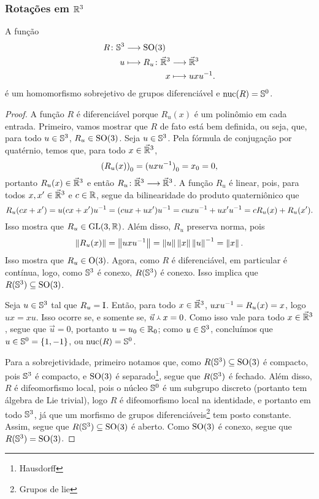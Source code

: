 \subsubsection{Rotações em \ensuremath{\R^3}}

\begin{proposition}
A função
	\begin{align*}
	\func{R}{\S^3}{\SO(3)}{u}{
		\begin{aligned}[t]
		\func{R_u}{\vec{\R}^3}{\vec{\R}^3}{x}{uxu\inv}.
		\end{aligned}
	}
	\end{align*}
é um homomorfismo sobrejetivo de grupos diferenciável e $\nuc(R)=\S^0$.
\end{proposition}
\begin{proof}
A função $R$ é diferenciável porque $R_u(x)$ é um polinômio em cada entrada. Primeiro, vamos mostrar que $R$ de fato está bem definida, ou seja, que, para todo $u \in \S^3$, $R_u \in \SO(3)$. Seja $u \in \S^3$. Pela fórmula de conjugação por quatérnio, temos que, para todo $x \in \vec{\R}^3$,
	\begin{equation*}
	\esc{(R_u(x))} = \esc{(uxu\inv)} = \esc{x} = 0,
	\end{equation*}
portanto $R_u(x) \in \vec{\R}^3$ e então $\fun{R_u}{\vec{\R}^3}{\vec{\R}^3}$. A função $R_u$ é linear, pois, para todos $x,x' \in \vec{\R}^3$ e $c \in \R$, segue da bilinearidade do produto quaterniônico que
	\begin{equation*}
	R_u(cx+x') = u(cx+x')u\inv = (cux+ux')u\inv = cuxu\inv + ux'u\inv = cR_u(x) + R_u(x').
	\end{equation*}
Isso mostra que $R_u \in \GL(3,\R)$. Além disso, $R_u$ preserva norma, pois
	\begin{equation*}
	\nor{R_u(x)} = \nor{uxu\inv} = \nor{u}\nor{x}\nor{u}\inv = \nor{x}.
	\end{equation*}
Isso mostra que $R_u \in \GO(3)$. Agora, como $R$ é diferenciável, em particular é contínua, logo, como $\S^3$ é conexo, $R(\S^3)$ é conexo. Isso implica que $R(\S^3) \subseteq \SO(3)$.

Seja $u \in \S^3$ tal que $R_u=\Id$. Então, para todo $x \in \vec{\R}^3$, $uxu\inv = R_u(x) = x$, logo $ux=xu$. Isso ocorre se, e somente se, $\pvec{\vec{u}}{x} = 0$. Como isso vale para todo $x \in \vec{\R}^3$, segue que $\vec{u}=0$, portanto $u=\esc{u} \in \esc{\R}$; como $u \in \S^3$, concluímos que $u \in \S^0 = \{1,-1\}$, ou $\nuc(R) = \S^0$.

Para a sobrejetividade, primeiro notamos que, como $R(\S^3) \subseteq \SO(3)$ é compacto, pois $\S^3$ é compacto, e $\SO(3)$ é separado\footnote{Hausdorff}, segue que $R(\S^3)$ é fechado. Além disso, $R$ é difeomorfismo local, pois o núcleo $\S^0$ é um subgrupo discreto (portanto tem álgebra de Lie trivial), logo $R$ é difeomorfismo local na identidade, e portanto em todo $\S^3$, já que um morfismo de grupos diferenciáveis\footnote{Grupos de lie} tem posto constante. Assim, segue que $R(\S^3) \subseteq \SO(3)$ é aberto. Como $\SO(3)$ é conexo, segue que $R(\S^3) = \SO(3)$.
\end{proof}

